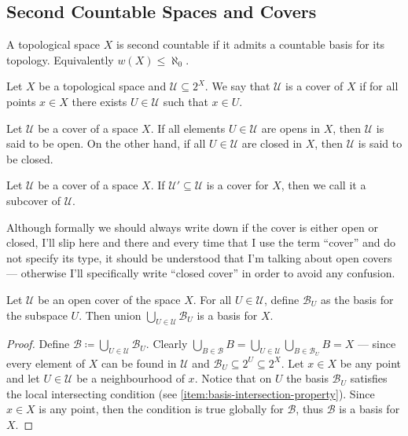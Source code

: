 \subsection{Second Countable Spaces and Covers}

\begin{definition}\label{def: second countable}
A topological space \(X\) is second countable if it admits a countable basis
for its topology. Equivalently \(w(X) \leq \aleph_0\).
\end{definition}

\begin{definition}[Cover]\label{def: cover}
Let \(X\) be a topological space and \(\mathcal U \subseteq 2^X\). We say that
\(\mathcal U\) is a cover of \(X\) if for all points \(x \in X\) there exists
\(U \in \mathcal U\) such that \(x \in U\).
\end{definition}

\begin{definition}
Let \(\mathcal U\) be a cover of a space \(X\). If all elements \(U \in
\mathcal U\) are opens in \(X\), then \(\mathcal U\) is said to be open. On
the other hand, if all \(U \in \mathcal U\) are closed in \(X\), then
\(\mathcal U\) is said to be closed.
\end{definition}

\begin{definition}[Subcover]
Let \(\mathcal U\) be a cover of a space \(X\). If \(\mathcal U' \subseteq
\mathcal U\) is a cover for \(X\), then we call it a subcover of \(\mathcal
U\).
\end{definition}

Although formally we should always write down if the cover is either open or
closed, I'll slip here and there and every time that I use the term ``cover''
and do not specify its type, it should be understood that I'm talking about open
covers --- otherwise I'll specifically write ``closed cover'' in order to avoid
any confusion.

\begin{proposition}
\label{prop:union-cover-basis}
Let \(\mathcal U\) be an open cover of the space \(X\). For all \(U \in \mathcal
U\), define \(\mathcal{B}_U\) as the basis for the subspace \(U\). Then union
\(\bigcup_{U \in \mathcal U} \mathcal{B}_U\) is a basis for \(X\).
\end{proposition}

\begin{proof}
Define \(\mathcal B \coloneq \bigcup_{U \in \mathcal U} \mathcal B_{U}\).
Clearly \(\bigcup_{B \in \mathcal B} B = \bigcup_{U \in \mathcal U} \bigcup_{B
\in \mathcal B_U} B = X\) --- since every element of \(X\) can be found in
\(\mathcal U\) and \(\mathcal B_U \subseteq 2^U \subseteq 2^{X}\). Let \(x \in
X\) be any point and let \(U \in \mathcal U\) be a neighbourhood of
\(x\). Notice that on \(U\) the basis \(\mathcal B_U\) satisfies the local
intersecting condition (see \cref{item:basis-intersection-property}). Since \(x
\in X\) is any point, then the condition is true globally for \(\mathcal B\),
thus \(\mathcal B\) is a basis for \(X\).
\end{proof}

